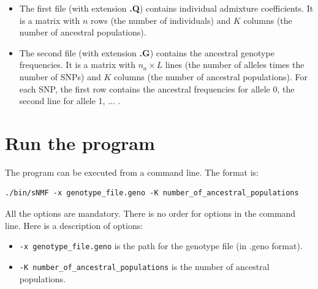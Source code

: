 \documentclass[10pt,a4paper]{article}
\begin{document}
\begin{itemize}
\item The first file (with extension {\bf .Q}) contains individual admixture coefficients.
It is a matrix with $n$ rows (the number of individuals) and $K$ columns (the 
number of ancestral populations).
\item The second file (with extension {\bf .G}) contains the ancestral genotype frequencies.
It is a matrix with $n_a\times L$ lines (the number of alleles times the number of SNPs) and $K$ columns (the 
number of ancestral populations). For each SNP, the first row contains the ancestral frequencies for allele 0, the second line for allele 1, ... .
\end{itemize}

\section{Run the program}
The program can be executed from a command line. The format is:
\begin{Verbatim}[frame=single]
./bin/sNMF -x genotype_file.geno -K number_of_ancestral_populations 
\end{Verbatim}

\noindent
All the options are mandatory. There is no order for options in the command line. 
Here is a description of options:
\begin{itemize}
\item \verb|-x genotype_file.geno| is the path for the genotype file (in .geno format).
\item \verb|-K number_of_ancestral_populations| is the number of ancestral populations. 
\end{itemize}
\end{document}
